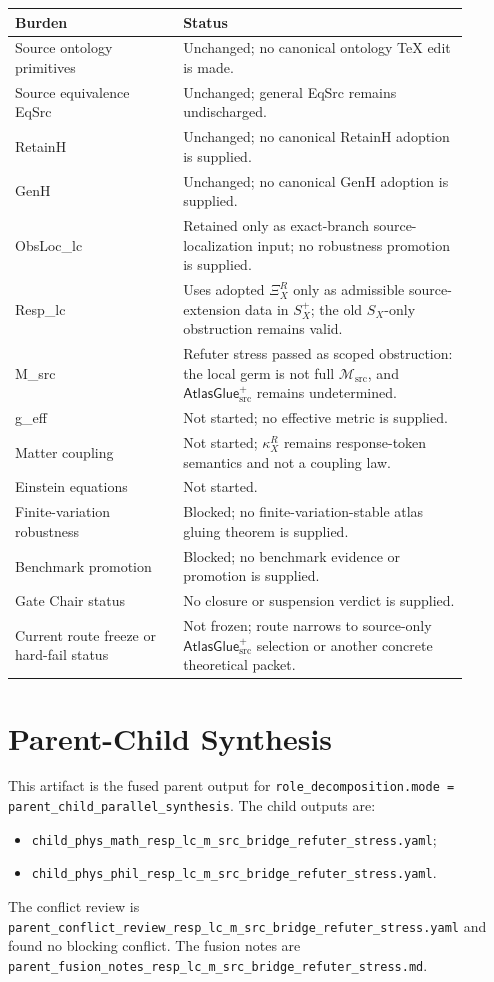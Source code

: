 \documentclass[11pt]{article}
\newcommand{\Msrc}{\mathcal{M}_{\mathrm{src}}}
\newcommand{\XiR}{\Xi_X^R}
\newcommand{\SX}{S_X}
\newcommand{\Splus}{S_X^+}
\newcommand{\AtlasGlue}{\mathsf{AtlasGlue}_{\mathrm{src}}^{+}}
\begin{document}
\begin{center}
\begin{tabular}{p{0.33\linewidth}p{0.57\linewidth}}
\hline
Burden & Status \\
\hline
Source ontology primitives & Unchanged; no canonical ontology TeX edit is made. \\
Source equivalence EqSrc & Unchanged; general EqSrc remains undischarged. \\
RetainH & Unchanged; no canonical RetainH adoption is supplied. \\
GenH & Unchanged; no canonical GenH adoption is supplied. \\
ObsLoc\_lc & Retained only as exact-branch source-localization input; no robustness promotion is supplied. \\
Resp\_lc & Uses adopted \(\XiR\) only as admissible source-extension data in \(\Splus\); the old \(\SX\)-only obstruction remains valid. \\
M\_src & Refuter stress passed as scoped obstruction: the local germ is not full \(\Msrc\), and \(\AtlasGlue\) remains undetermined. \\
g\_eff & Not started; no effective metric is supplied. \\
Matter coupling & Not started; \(\kappa_X^R\) remains response-token semantics and not a coupling law. \\
Einstein equations & Not started. \\
Finite-variation robustness & Blocked; no finite-variation-stable atlas gluing theorem is supplied. \\
Benchmark promotion & Blocked; no benchmark evidence or promotion is supplied. \\
Gate Chair status & No closure or suspension verdict is supplied. \\
Current route freeze or hard-fail status & Not frozen; route narrows to source-only \(\AtlasGlue\) selection or another concrete theoretical packet. \\
\hline
\end{tabular}
\end{center}

\section{Parent-Child Synthesis}

This artifact is the fused parent output for
\texttt{role\_decomposition.mode = parent\_child\_parallel\_synthesis}. The
child outputs are:
\begin{itemize}
  \item \texttt{child\_phys\_math\_resp\_lc\_m\_src\_bridge\_refuter\_stress.yaml};
  \item \texttt{child\_phys\_phil\_resp\_lc\_m\_src\_bridge\_refuter\_stress.yaml}.
\end{itemize}
The conflict review is
\texttt{parent\_conflict\_review\_resp\_lc\_m\_src\_bridge\_refuter\_stress.yaml}
and found no blocking conflict. The fusion notes are
\texttt{parent\_fusion\_notes\_resp\_lc\_m\_src\_bridge\_refuter\_stress.md}.
\end{document}
